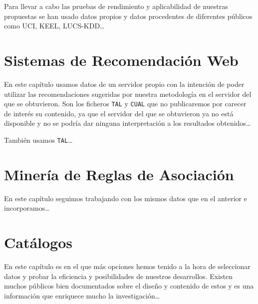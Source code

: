 Para llevar a cabo las pruebas de rendimiento y aplicabilidad de nuestras propuestas se han usado datos propios y datos procedentes de diferentes \datasets públicos como UCI, KEEL, LUCS-KDD\ldots





\section{Sistemas de Recomendación Web}
En este capítulo usamos datos de un servidor propio con la intención de poder utilizar las recomendaciones sugeridas por nuestra metodología en el servidor del que se obtuvieron. Son los ficheros \texttt{TAL} y \texttt{CUAL} que no publicaremos por carecer de interés su contenido, ya que el servidor del que se obtuvieron ya no está disponible y no se podría dar ninguna interpretación a los resultados obtenidos\ldots

También usamos \texttt{TAL}\ldots




\section{Minería de Reglas de Asociación}
En este capítulo seguimos trabajando con los mismos datos que en el anterior e incorporamos\ldots




\section{Catálogos}
En este capítulo es en el que más opciones hemos tenido a la hora de seleccionar datos y probar la eficiencia y posibilidades de nuestros desarrollos. Existen muchos \datasets públicos bien documentados sobre el diseño y contenido de estos \datasets y es una información que enriquece mucho la investigación\ldots




